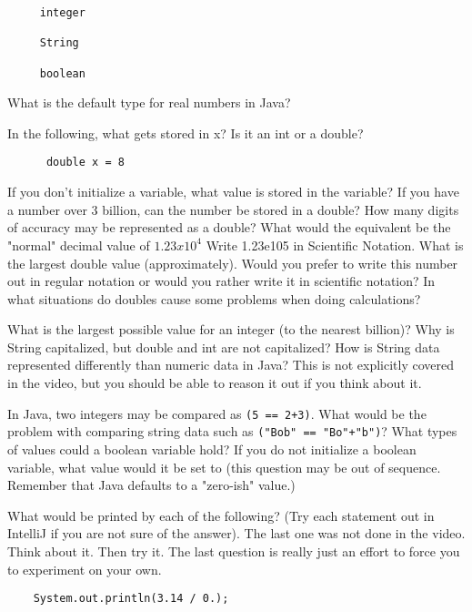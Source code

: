 \documentclass[letterpaper,11pt]{exam}
\begin{document}
\begin{questions}
\begin{samepage}
\begin{verbatim}
     integer

     String

     boolean
\end{verbatim}
\end{samepage}
\question What is the default type for real numbers in Java?
\begin{samepage}
\question In the following, what gets stored in x?  Is it an int or a double?
\begin{verbatim}
      double x = 8
\end{verbatim}
\end{samepage}
\question If you don't initialize a variable, what value is stored in the variable?
\question If you have a number over 3 billion, can the number be stored in a double?
\question How many digits of accuracy may be represented as a double?
\question What would the equivalent be the "normal" decimal value of $1.23 x 10^4$
\question Write 1.23e105 in Scientific Notation.
\question What is the largest double value (approximately).  Would you prefer to write this number out in regular notation or would you rather write it in scientific notation?
\question In what situations do doubles cause some problems when doing calculations?

\question What is the largest possible value for an integer (to the nearest billion)?
\question Why is String capitalized, but double and int are not capitalized?
\question How is String data represented differently than numeric data in Java?
\vspace{1cm}
\question This is not explicitly covered in the video, but you should be able to reason it out if you think about it.  

In Java, two integers may be compared as \texttt{(5 == 2+3)}.  What would be the problem with comparing string data such as \texttt{("Bob" == "Bo"+"b")}?
\vspace{1cm}
\question What types of values could a boolean variable hold?
\question If you do not initialize a boolean variable, what value would it be set to (this question may be out of sequence.  Remember that Java defaults to a "zero-ish" value.)
\begin{samepage}
\question What would be printed by each of the following?  (Try each statement out in IntelliJ if you are not sure of the answer).  The last one was not done in the video.  Think about it.  Then try it.  The last question is really just an effort to force you to experiment on your own.
\begin{verbatim}
    System.out.println(3.14 / 0.);


\end{verbatim}
\end{samepage}
\end{questions}
\end{document}

